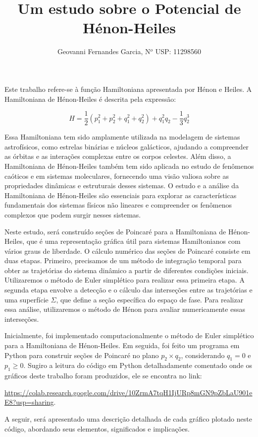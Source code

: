 \documentclass[a4paper,12pt]{article}
\title{\textbf{Um estudo sobre o Potencial de Hénon-Heiles}}
\author{Geovanni Fernandes Garcia, N$^o$ USP: 11298560}
\begin{document}
\maketitle

Este trabalho refere-se à função Hamiltoniana apresentada por Hénon e Heiles. A Hamiltoniana de Hénon-Heiles é descrita pela expressão:

$$H = \dfrac{1}{2}(p_1^2+p_2^2+q_1^2+q_2^2) + q_1^2q_2 - \dfrac{1}{3}q_2^3$$

Essa Hamiltoniana tem sido amplamente utilizada na modelagem de sistemas astrofísicos, como estrelas binárias e núcleos galácticos, ajudando a compreender as órbitas e as interações complexas entre os corpos celestes. Além disso, a Hamiltoniana de Hénon-Heiles também tem sido aplicada no estudo de fenômenos caóticos e em sistemas moleculares, fornecendo uma visão valiosa sobre as propriedades dinâmicas e estruturais desses sistemas. O estudo e a análise da Hamiltoniana de Hénon-Heiles são essenciais para explorar as características fundamentais dos sistemas físicos não lineares e compreender os fenômenos complexos que podem surgir nesses sistemas.

Neste estudo, será construído seções de Poincaré para a Hamiltoniana de Hénon-Heiles, que é uma representação gráfica útil para sistemas Hamiltonianos com vários graus de liberdade. O cálculo numérico das seções de Poincaré consiste em duas etapas. Primeiro, precisamos de um método de integração temporal para obter as trajetórias do sistema dinâmico a partir de diferentes condições iniciais. Utilizaremos o método de Euler simplético para realizar essa primeira etapa. A segunda etapa envolve a detecção e o cálculo das interseções entre as trajetórias e uma superfície $\Sigma$, que define a seção específica do espaço de fase. Para realizar essa análise, utilizaremos o método de Hénon para avaliar numericamente essas interseções.

Inicialmente, foi implementado computacionalmente o método de Euler simplético para a Hamiltoniana de Hénon-Heiles. Em seguida, foi feito um programa em Python para construir seções de Poincaré no plano $p_2\times q_2$, considerando $q_1 = 0$ e $p_1 \geq 0$. Sugiro a leitura do código em Python detalhadamente comentado onde os gráficos deste trabalho foram produzidos, ele se encontra no link:

\url{https://colab.research.google.com/drive/10ZrmA7tqH1IjURp8mGN9pZbLaU901eE8?usp=sharing}.

A seguir, será apresentado uma descrição detalhada de cada gráfico plotado neste código, abordando seus elementos, significados e implicações.
\end{document}
